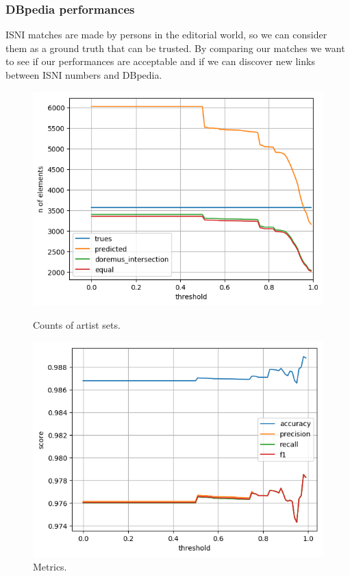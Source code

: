 \documentclass[paper=a4, fontsize=11pt]{scrartcl}
\begin{document}
\subsubsection{DBpedia performances}
ISNI matches are made by persons in the editorial world, so we can consider them as a ground truth that can be trusted. By comparing our matches we want to see if our performances are acceptable and if we can discover new links between ISNI numbers and DBpedia.

\begin{figure}[!htb]
  \centering
  \begin{minipage}[b]{0.49\textwidth}
    \includegraphics[width=\textwidth]{images/counts_artists.png}
    \caption{Counts of artist sets.}
  \end{minipage}
  \hfill
  \begin{minipage}[b]{0.49\textwidth}
    \includegraphics[width=\textwidth]{images/metrics_artists.png}
    \caption{Metrics.}
  \end{minipage}
\end{figure}
\end{document}

